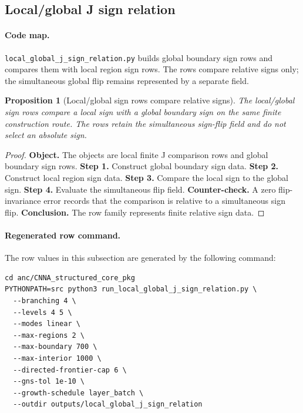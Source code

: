 \documentclass[11pt]{article}
\newtheorem{proposition}[definition]{Proposition}
\theoremstyle{remark}
\newcommand{\code}[1]{\texttt{#1}}
\numberwithin{equation}{section}
\begin{document}
\subsection{Local/global J sign relation}
\paragraph{Code map.} \code{local\_\allowbreak{}global\_\allowbreak{}j\_\allowbreak{}sign\_\allowbreak{}relation.py} builds global boundary sign rows and compares them with local region sign rows. The rows compare relative signs only; the simultaneous global flip remains represented by a separate field.

\begin{proposition}[Local/global sign rows compare relative signs]
The local/global sign rows compare a local sign with a global boundary sign on the same finite construction route. The rows retain the simultaneous sign-flip field and do not select an absolute sign.
\end{proposition}
\begin{proof}
\textbf{Object.} The objects are local finite J comparison rows and global boundary sign rows. \textbf{Step 1.} Construct global boundary sign data. \textbf{Step 2.} Construct local region sign data. \textbf{Step 3.} Compare the local sign to the global sign. \textbf{Step 4.} Evaluate the simultaneous flip field. \textbf{Counter-check.} A zero flip-invariance error records that the comparison is relative to a simultaneous sign flip. \textbf{Conclusion.} The row family represents finite relative sign data.
\end{proof}

\paragraph{Regenerated row command.}
The row values in this subsection are generated by the following command:
\begin{verbatim}
cd anc/CNNA_structured_core_pkg
PYTHONPATH=src python3 run_local_global_j_sign_relation.py \
  --branching 4 \
  --levels 4 5 \
  --modes linear \
  --max-regions 2 \
  --max-boundary 700 \
  --max-interior 1000 \
  --directed-frontier-cap 6 \
  --gns-tol 1e-10 \
  --growth-schedule layer_batch \
  --outdir outputs/local_global_j_sign_relation
\end{verbatim}
\end{document}
